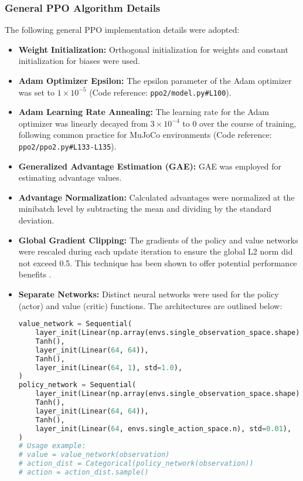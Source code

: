 \documentclass{article}
\begin{document}
\subsubsection{General PPO Algorithm Details}
The following general PPO implementation details were adopted:
\begin{itemize}
    \item \textbf{Weight Initialization:} Orthogonal initialization for weights and constant initialization for biases were used.
    \item \textbf{Adam Optimizer Epsilon:} The epsilon parameter of the Adam optimizer was set to \(1 \times 10^{-5}\) (Code reference: \texttt{ppo2/model.py\#L100}).
    \item \textbf{Adam Learning Rate Annealing:} The learning rate for the Adam optimizer was linearly decayed from \(3 \times 10^{-4}\) to 0 over the course of training, following common practice for MuJoCo environments (Code reference: \texttt{ppo2/ppo2.py\#L133-L135}).
    \item \textbf{Generalized Advantage Estimation (GAE):} GAE was employed for estimating advantage values.
    \item \textbf{Advantage Normalization:} Calculated advantages were normalized at the minibatch level by subtracting the mean and dividing by the standard deviation.
    \item \textbf{Global Gradient Clipping:} The gradients of the policy and value networks were rescaled during each update iteration to ensure the global L2 norm did not exceed 0.5. This technique has been shown to offer potential performance benefits \cite{andrychowicz2021what}.
    \item \textbf{Separate Networks:} Distinct neural networks were used for the policy (actor) and value (critic) functions. The architectures are outlined below:

    \begin{minipage}{0.9\textwidth}
    \begin{lstlisting}[language=Python]
value_network = Sequential(
    layer_init(Linear(np.array(envs.single_observation_space.shape).prod(), 64)),
    Tanh(),
    layer_init(Linear(64, 64)),
    Tanh(),
    layer_init(Linear(64, 1), std=1.0),
)
policy_network = Sequential(
    layer_init(Linear(np.array(envs.single_observation_space.shape).prod(), 64)),
    Tanh(),
    layer_init(Linear(64, 64)),
    Tanh(),
    layer_init(Linear(64, envs.single_action_space.n), std=0.01),
)
# Usage example:
# value = value_network(observation)
# action_dist = Categorical(policy_network(observation))
# action = action_dist.sample()
    \end{lstlisting}
    \end{minipage}
\end{itemize}
\end{document}
